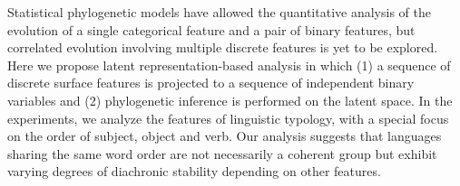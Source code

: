 Statistical phylogenetic models have allowed the quantitative analysis of the evolution of a single categorical feature and a pair of binary features, but correlated evolution involving multiple discrete features is yet to be explored. Here we propose latent representation-based analysis in which (1) a sequence of discrete surface features is projected to a sequence of independent binary variables and (2) phylogenetic inference is performed on the latent space. In the experiments, we analyze the features of linguistic typology, with a special focus on the order of subject, object and verb. Our analysis suggests that languages sharing the same word order are not necessarily a coherent group but exhibit varying degrees of diachronic stability depending on other features.
